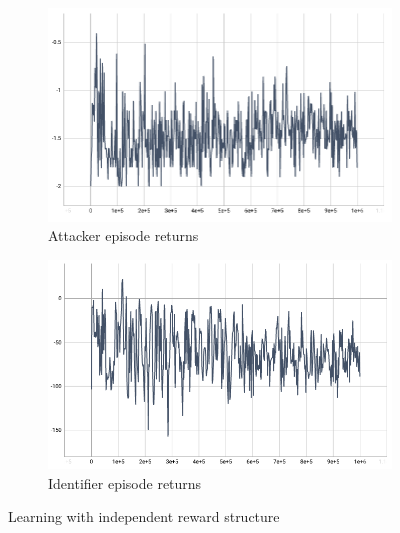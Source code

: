 \documentclass[a4paper,11pt]{article}
\begin{document}
\begin{figure}[h!]
  \centering
  \begin{subfigure}[b]{0.49\linewidth}
    \includegraphics[width=\linewidth]{graphs/test_attacker_agent_return_mean_independent.PNG}
    \caption{Attacker episode returns}
  \end{subfigure}
  \begin{subfigure}[b]{0.49\linewidth}
    \includegraphics[width=\linewidth]{graphs/test_identifier_agent_return_mean_independent.PNG}
    \caption{Identifier episode returns}
  \end{subfigure}
  \caption{Learning with independent reward structure}
  \label{fig:coffee}
\end{figure}
\end{document}
